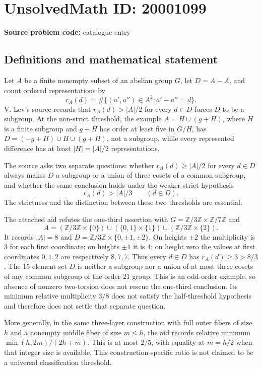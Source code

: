 \documentclass[11pt]{article}
\newcommand{\Z}{\mathbb{Z}}
\begin{document}
\section*{UnsolvedMath ID: 20001099}
\textbf{Source problem code:} catalogue entry
\subsection{Definitions and mathematical statement}
Let $A$ be a finite nonempty subset of an abelian group $G$, let $D=A-A$, and count ordered representations by
\[
 r_A(d)=\#\{(a',a'')\in A^2:a'-a''=d\}.
\]
V. Lev's source records that $r_A(d)>|A|/2$ for every $d\in D$ forces $D$ to be a subgroup. At the non-strict threshold, the example $A=H\cup(g+H)$, where $H$ is a finite subgroup and $g+H$ has order at least five in $G/H$, has
$D=(-g+H)\cup H\cup(g+H)$, not a subgroup, while every represented difference has at least $|H|=|A|/2$ representations.

The source asks two separate questions: whether $r_A(d)\geq|A|/2$ for every $d\in D$ always makes $D$ a subgroup or a union of three cosets of a common subgroup, and whether the same conclusion holds under the weaker strict hypothesis
\[
 r_A(d)>|A|/3\qquad(d\in D).
\]
The strictness and the distinction between these two thresholds are essential.

The attached aid refutes the one-third assertion with $G=\Z/3\Z\times\Z/7\Z$ and
\[
 A=(\Z/3\Z\times\{0\})\cup(\{0,1\}\times\{1\})\cup(\Z/3\Z\times\{2\}).
\]
It records $|A|=8$ and $D=\Z/3\Z\times\{0,\pm1,\pm2\}$. On heights $\pm2$ the multiplicity is $3$ for each first coordinate; on heights $\pm1$ it is $4$; on height zero the values at first coordinates $0,1,2$ are respectively $8,7,7$. Thus every $d\in D$ has $r_A(d)\geq3>8/3$. The $15$-element set $D$ is neither a subgroup nor a union of at most three cosets of any common subgroup of the order-$21$ group. This is an odd-order example, so absence of nonzero two-torsion does not rescue the one-third conclusion. Its minimum relative multiplicity $3/8$ does not satisfy the half-threshold hypothesis and therefore does not settle that separate question.

More generally, in the same three-layer construction with full outer fibers of size $h$ and a nonempty middle fiber of size $m\leq h$, the aid records relative minimum $\min(h,2m)/(2h+m)$. This is at most $2/5$, with equality at $m=h/2$ when that integer size is available. This construction-specific ratio is not claimed to be a universal classification threshold.
\end{document}
